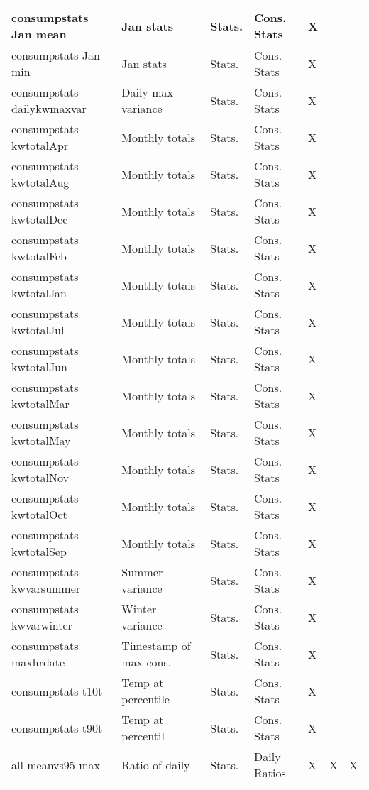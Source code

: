 {{\begin{longtable}[l]{ | p{4cm} | p{4cm} | p{1cm} | p{2cm} | p{0.3cm} | p{0.3cm} | p{0.3cm} |}
	 consumpstats Jan mean & Jan stats & Stats. & Cons. Stats & X & \  & \  \\ \hline
	 consumpstats Jan min & Jan stats & Stats. & Cons. Stats & X & \  & \  \\ \hline
	 consumpstats dailykwmaxvar & Daily max variance & Stats. & Cons. Stats & X & \  & \  \\ \hline
	 consumpstats kwtotalApr & Monthly totals & Stats. & Cons. Stats & X & \  & \  \\ \hline
	 consumpstats kwtotalAug & Monthly totals & Stats. & Cons. Stats & X & \  & \  \\ \hline
	 consumpstats kwtotalDec & Monthly totals & Stats. & Cons. Stats & X & \  & \  \\ \hline
	 consumpstats kwtotalFeb & Monthly totals & Stats. & Cons. Stats & X & \  & \  \\ \hline
	 consumpstats kwtotalJan & Monthly totals & Stats. & Cons. Stats & X & \  & \  \\ \hline
	 consumpstats kwtotalJul & Monthly totals & Stats. & Cons. Stats & X & \  & \  \\ \hline
	 consumpstats kwtotalJun & Monthly totals & Stats. & Cons. Stats & X & \  & \  \\ \hline
	 consumpstats kwtotalMar & Monthly totals & Stats. & Cons. Stats & X & \  & \  \\ \hline
	 consumpstats kwtotalMay & Monthly totals & Stats. & Cons. Stats & X & \  & \  \\ \hline
	 consumpstats kwtotalNov & Monthly totals & Stats. & Cons. Stats & X & \  & \  \\ \hline
	 consumpstats kwtotalOct & Monthly totals & Stats. & Cons. Stats & X & \  & \  \\ \hline
	 consumpstats kwtotalSep & Monthly totals & Stats. & Cons. Stats & X & \  & \  \\ \hline
	 consumpstats kwvarsummer & Summer variance & Stats. & Cons. Stats & X & \  & \  \\ \hline
	 consumpstats kwvarwinter & Winter variance & Stats. & Cons. Stats & X & \  & \  \\ \hline
	 consumpstats maxhrdate & Timestamp of max cons. & Stats. & Cons. Stats & X & \  & \  \\ \hline
	 consumpstats t10t & Temp at percentile & Stats. & Cons. Stats & X & \  & \  \\ \hline
	 consumpstats t90t & Temp at percentil & Stats. & Cons. Stats & X & \  & \  \\ \hline
	 all meanvs95 max & Ratio of daily  & Stats. & Daily Ratios & X & X & X \\ \hline

\end{longtable}}}
